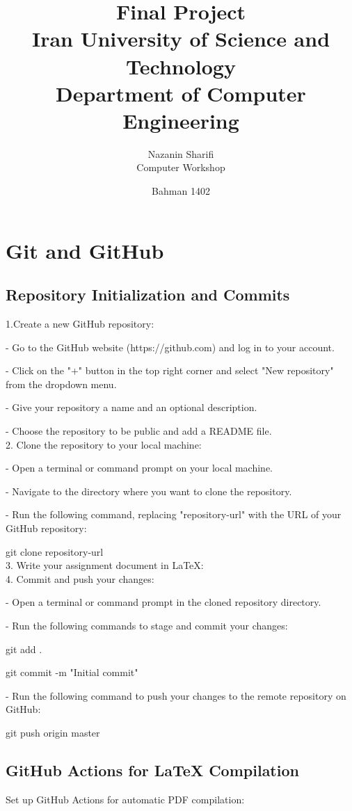 \documentclass[12pt]{article}
\title{
	\vspace{2in}
	\textbf{Final Project}\\
	\vspace{.2 in}
	\large Iran University of Science and Technology\\
	\large Department of Computer Engineering\\
	\vspace{2in}
}
\author{
	\vspace{0.2in}
	Nazanin Sharifi\\
	Computer Workshop 
	\vspace{0.2in}
}
\date{ Bahman 1402}
\begin{document}
	\begin{titlepage}
	\maketitle
	\thispagestyle{empty}
\end{titlepage}
\newpage
\tableofcontents
\newpage
\section{Git and GitHub}
\subsection{Repository Initialization and Commits}
1.Create a new GitHub repository:

- Go to the GitHub website (https://github.com) and log in to your account.

- Click on the "+" button in the top right corner and select "New repository" from the dropdown menu.

- Give your repository a name and an optional description.

- Choose  the repository to be public and add a README file.\\
2. Clone the repository to your local machine:

- Open a terminal or command prompt on your local machine.

- Navigate to the directory where you want to clone the repository.

- Run the following command, replacing "repository-url" with the URL of your GitHub repository:

git clone repository-url\\
3. Write your assignment document in LaTeX:\\
4. Commit and push your changes:

- Open a terminal or command prompt in the cloned repository directory.

- Run the following commands to stage and commit your changes:

git add .

git commit -m "Initial commit"



- Run the following command to push your changes to the remote repository on GitHub:

git push origin master

\subsection{GitHub Actions for LaTeX Compilation}
Set up GitHub Actions for automatic PDF compilation:
\end{document}
